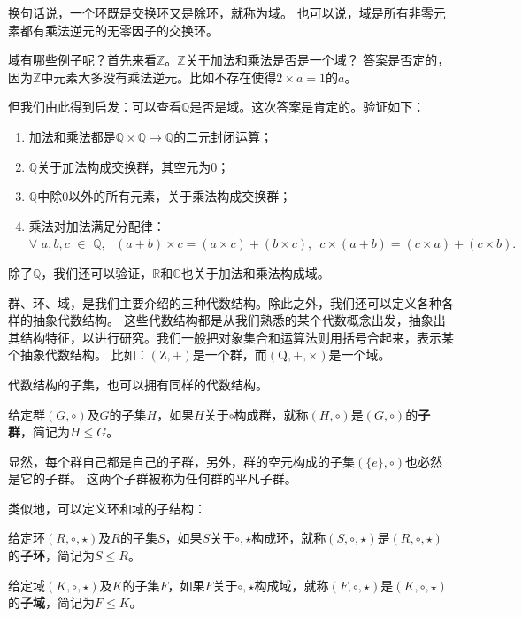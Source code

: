\documentclass[12pt,UTF8,fontset=none]{ctexbook}
\begin{document}
\begin{appendix}
换句话说，一个环既是交换环又是除环，就称为域。
也可以说，域是所有非零元素都有乘法逆元的无零因子的交换环。

域有哪些例子呢？首先来看$\mathbb{Z}$。$\mathbb{Z}$关于加法和乘法是否是一个域？
答案是否定的，因为$\mathbb{Z}$中元素大多没有乘法逆元。比如不存在使得$2\times a = 1$的$a$。

但我们由此得到启发：可以查看$\mathbb{Q}$是否是域。这次答案是肯定的。验证如下：
\begin{enumerate}
    \item 加法和乘法都是$\mathbb{Q} \times \mathbb{Q} \rightarrow \mathbb{Q}$的二元封闭运算；
    \item $\mathbb{Q}$关于加法构成交换群，其空元为$0$；
    \item $\mathbb{Q}$中除$0$以外的所有元素，关于乘法构成交换群；
    \item 乘法对加法满足分配律：$\forall \,\, a, b, c \,\, \in \,\, \mathbb{Q}, \,\,\,\, (a + b) \times c = (a \times c) + (b \times c), \,\,\, c \times (a + b) = (c \times a) + (c \times b).$
\end{enumerate}

除了$\mathbb{Q}$，我们还可以验证，$\mathbb{R}$和$\mathbb{C}$也关于加法和乘法构成域。

群、环、域，是我们主要介绍的三种代数结构。除此之外，我们还可以定义各种各样的抽象代数结构。
这些代数结构都是从我们熟悉的某个代数概念出发，抽象出其结构特征，以进行研究。我们一般把对象集合和运算法则用括号合起来，表示某个抽象代数结构。
比如：$\left(\mathrm{Z}, +\right)$是一个群，而$\left(\mathrm{Q}, +, \times\right)$是一个域。

代数结构的子集，也可以拥有同样的代数结构。

\begin{df}\label{df:0_3_1}
    给定群$(G, \circ)$及$G$的子集$H$，如果$H$关于$\circ$构成群，就称$(H, \circ)$是$(G, \circ)$的\textbf{子群}，简记为$H\leqslant G$。
\end{df}

显然，每个群自己都是自己的子群，另外，群的空元构成的子集$(\{e\}, \circ)$也必然是它的子群。
这两个子群被称为任何群的平凡子群。

类似地，可以定义环和域的子结构：
\begin{df}\label{df:0_3_2}
    给定环$(R, \circ, \star)$及$R$的子集$S$，如果$S$关于$\circ, \star$构成环，就称$(S, \circ, \star)$是$(R, \circ, \star)$的\textbf{子环}，简记为$S \leqslant R$。
\end{df}

\begin{df}\label{df:0_3_3}
    给定域$(K, \circ, \star)$及$K$的子集$F$，如果$F$关于$\circ, \star$构成域，就称$(F, \circ, \star)$是$(K, \circ, \star)$的\textbf{子域}，简记为$F \leqslant K$。
\end{df}


\end{appendix}
\end{document}
